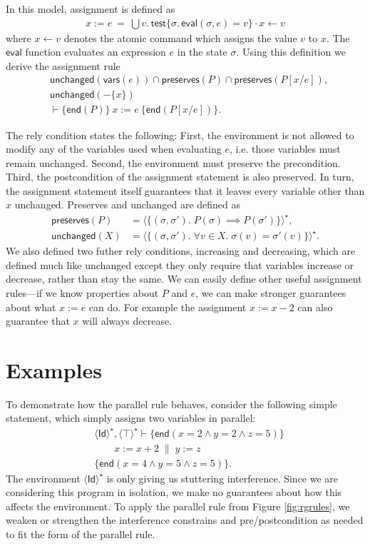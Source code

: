 \documentclass{llncs}
\newcommand{\test}{\mathsf{test}}
\newcommand{\eval}{\mathsf{eval}}
\newcommand{\Id}{\mathsf{Id}}
\newcommand{\edn}{\mathsf{end}}
\newcommand{\unchanged}{\mathsf{unchanged}}
\newcommand{\preserves}{\mathsf{preserves}}
\begin{document}
In this model, assignment is defined as
\begin{align*}
  x := e \ =\ \bigcup v.\,\test\{\sigma.\,\eval(\sigma,e) = v\} \cdot x \leftarrow v
\end{align*}
where $x \leftarrow v$ denotes the atomic command which assigns the
value $v$ to $x$. The $\eval$ function evaluates an expression $e$ in
the state $\sigma$. Using this definition we derive the assignment
rule
\begin{align*}
&\unchanged(\mathsf{vars}(e)) \cap \preserves(P) \cap \preserves(P[x/e]),\\
&\unchanged(- \{x\})\\
&\vdash \{\edn(P)\}\ x := e\ \{\edn(P[x/e])\}.
\end{align*}

The rely condition states the following: First, the environment is not
allowed to modify any of the variables used when evaluating $e$,
i.e. those variables must remain unchanged. Second, the
environment must preserve the precondition. Third, the postcondition
of the assignment statement is also preserved. In turn, the assignment
statement itself guarantees that it leaves every variable other than
$x$ unchanged. Preserves and unchanged are defined as
\begin{align*}
\preserves(P) &= \langle \{(\sigma,\sigma').\; P(\sigma) \implies P(\sigma')\}\rangle^\star,\\
\unchanged(X) &= \langle \{(\sigma,\sigma').\; \forall v\in X.\; \sigma(v) = \sigma'(v)\}\rangle^\star.
\end{align*}
We also defined two futher rely conditions, increasing and decreasing,
which are defined much like unchanged except they only require that
variables increase or decrease, rather than stay the same. We can
easily define other useful assignment rules---if we know properties about
$P$ and $e$, we can make stronger guarantees about what $x := e$ can
do. For example the assignment $x := x - 2$ can also guarantee that
$x$ will always decrease.

\section{Examples}
\label{sec:Examples}

To demonstrate how the parallel rule behaves, consider the following
simple statement, which simply assigns two variables in parallel:
\begin{align*}
&\langle\Id\rangle^\star, \langle\top\rangle^\star \vdash \{\edn(x = 2 \land y = 2 \land z = 5)\}\\
&\qquad x := x + 2 \;\|\; y := z\\
&\{\edn (x = 4 \land y = 5 \land z = 5)\}.
\end{align*}
The environment $\langle\Id\rangle^\star$ is only giving us stuttering
interference. Since we are considering this program in isolation, we
make no guarantees about how this affects the environment. To apply
the parallel rule from Figure \ref{fig:rgrules}, we weaken or
strengthen the interference constrains and pre/postcondition as needed
to fit the form of the parallel rule.
\end{document}
